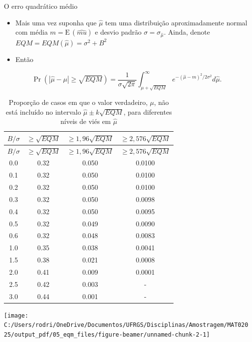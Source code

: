 \documentclass[
  10pt,
  ignorenonframetext,
]{beamer}
\providecommand{\tightlist}{%
  \setlength{\itemsep}{0pt}\setlength{\parskip}{0pt}}
\def\E{\mbox{E}\,}
\begin{document}
\begin{frame}[allowframebreaks]{O erro quadrático médio}
\protect\hypertarget{o-erro-quadruxe1tico-muxe9dio-2}{}
\begin{itemize}
\tightlist
\item
  Mais uma vez suponha que \(\hat{\mu}\) tem uma distribuição
  aproximadamente normal com média \(m = \E(\hat{mu})\) e desvio padrão
  \(\sigma = \sigma_{\hat{\mu}}\). Ainda, denote
  \(EQM = EQM(\hat{\mu}) = \sigma^2 + B^2\)
\item
  Então
\end{itemize}

\[
\Pr\left(|\hat{\mu} - \mu| \geq  \sqrt{EQM}\right) = \frac{1}{\sigma\sqrt{2\pi}}\int_{\mu + \sqrt{EQM}}^{\infty}{e^{-(\hat{\mu} - m)^2/2\sigma^2}d\hat{\mu}}.
\]

\framebreak

\begin{longtable}[]{@{}cccc@{}}
\caption{Proporção de casos em que o valor verdadeiro, \(\mu\), não está
incluído no intervalo \(\hat{\mu} \pm k\sqrt{EQM}\), para diferentes
níveis de viés em \(\hat{\mu}\)}\tabularnewline
\toprule
\(B/\sigma\) & \(\geq \sqrt{EQM}\) & \(\geq 1,96\sqrt{EQM}\) &
\(\geq 2,576\sqrt{EQM}\) \\
\midrule
\endfirsthead
\toprule
\(B/\sigma\) & \(\geq \sqrt{EQM}\) & \(\geq 1,96\sqrt{EQM}\) &
\(\geq 2,576\sqrt{EQM}\) \\
\midrule
\endhead
0.0 & 0.32 & 0.050 & 0.0100 \\
0.1 & 0.32 & 0.050 & 0.0100 \\
0.2 & 0.32 & 0.050 & 0.0100 \\
0.3 & 0.32 & 0.050 & 0.0098 \\
0.4 & 0.32 & 0.050 & 0.0095 \\
0.5 & 0.32 & 0.049 & 0.0090 \\
0.6 & 0.32 & 0.048 & 0.0083 \\
1.0 & 0.35 & 0.038 & 0.0041 \\
1.5 & 0.38 & 0.021 & 0.0008 \\
2.0 & 0.41 & 0.009 & 0.0001 \\
2.5 & 0.42 & 0.003 & - \\
3.0 & 0.44 & 0.001 & - \\
\bottomrule
\end{longtable}

\framebreak

\begin{center}\texttt{[image: C:/Users/rodri/OneDrive/Documentos/UFRGS/Disciplinas/Amostragem/MAT02025/output\_pdf/05\_eqm\_files/figure-beamer/unnamed-chunk-2-1]} \end{center}
\end{frame}
\end{document}
